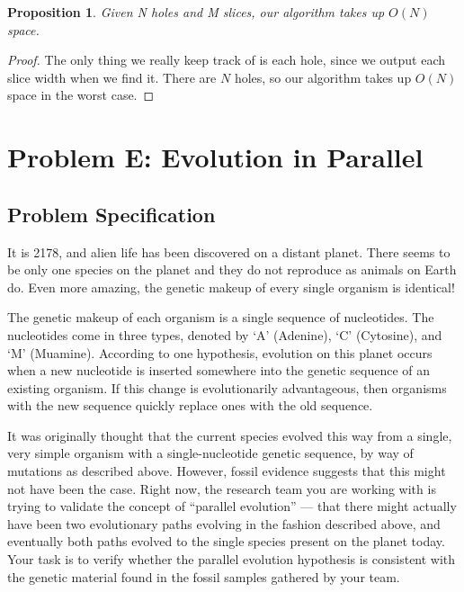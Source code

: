 \documentclass[12pt]{article}
\newtheorem{proposition}[theorem]{Proposition}
\begin{document}
\begin{proposition}
    Given N holes and M slices, our algorithm takes up
    $O(N)$ space.
\end{proposition}

\begin{proof}
    The only thing we really keep track of is each hole,
    since we output each slice width when we find it. There
    are $N$ holes, so our algorithm takes up $O(N)$ space
    in the worst case.
\end{proof}

\newpage

\section{Problem E: Evolution in Parallel}

\subsection{Problem Specification}

It is 2178, and alien life has been discovered on a distant planet.
There seems to be only one species on the planet and they do not
reproduce as animals on Earth do. Even more amazing, the genetic
makeup of every single organism is identical!

The genetic makeup of each organism is a single sequence of nucleotides.
The nucleotides come in three types, denoted by ‘A’ (Adenine), ‘C’
(Cytosine), and ‘M’ (Muamine). According to one hypothesis, evolution
on this planet occurs when a new nucleotide is inserted somewhere into
the genetic sequence of an existing organism. If this change is
evolutionarily advantageous, then organisms with the new sequence quickly
replace ones with the old sequence.

It was originally thought that the current species evolved this
way from a single, very simple organism with a single-nucleotide
genetic sequence, by way of mutations as described above. However,
fossil evidence suggests that this might  not have been the case.
Right now, the research team you are working with is trying to
validate the concept of ``parallel evolution'' — that there might
actually have been two evolutionary paths evolving in the fashion
described above, and eventually both paths evolved to the single
species present on the planet today. Your task is to verify whether
the parallel evolution hypothesis is consistent with the genetic material
found in the fossil samples gathered by your team.
\end{document}
